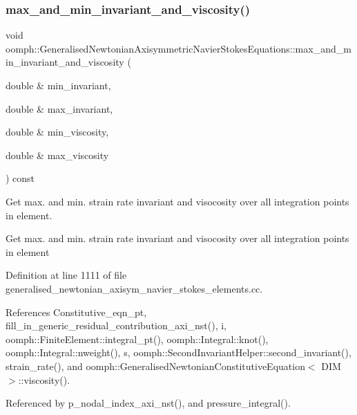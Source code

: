 \subsubsection{\texorpdfstring{max\+\_\+and\+\_\+min\+\_\+invariant\+\_\+and\+\_\+viscosity()}{max\_and\_min\_invariant\_and\_viscosity()}}
{\footnotesize\ttfamily void oomph\+::\+Generalised\+Newtonian\+Axisymmetric\+Navier\+Stokes\+Equations\+::max\+\_\+and\+\_\+min\+\_\+invariant\+\_\+and\+\_\+viscosity (\begin{DoxyParamCaption}\item[{double \&}]{min\+\_\+invariant,  }\item[{double \&}]{max\+\_\+invariant,  }\item[{double \&}]{min\+\_\+viscosity,  }\item[{double \&}]{max\+\_\+viscosity }\end{DoxyParamCaption}) const}



Get max. and min. strain rate invariant and visocosity over all integration points in element. 

Get max. and min. strain rate invariant and visocosity over all integration points in element 

Definition at line 1111 of file generalised\+\_\+newtonian\+\_\+axisym\+\_\+navier\+\_\+stokes\+\_\+elements.\+cc.



References Constitutive\+\_\+eqn\+\_\+pt, fill\+\_\+in\+\_\+generic\+\_\+residual\+\_\+contribution\+\_\+axi\+\_\+nst(), i, oomph\+::\+Finite\+Element\+::integral\+\_\+pt(), oomph\+::\+Integral\+::knot(), oomph\+::\+Integral\+::nweight(), s, oomph\+::\+Second\+Invariant\+Helper\+::second\+\_\+invariant(), strain\+\_\+rate(), and oomph\+::\+Generalised\+Newtonian\+Constitutive\+Equation$<$ D\+I\+M $>$\+::viscosity().



Referenced by p\+\_\+nodal\+\_\+index\+\_\+axi\+\_\+nst(), and pressure\+\_\+integral().

\mbox{\label{classoomph_1_1GeneralisedNewtonianAxisymmetricNavierStokesEquations_a2fab3fc070cd9506f16e7d775f380346}} 
